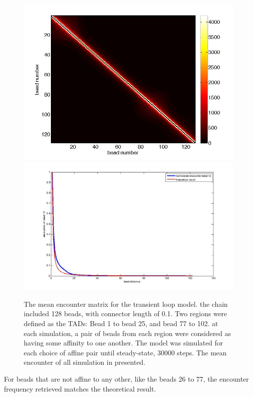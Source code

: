 \documentclass[12pt]{book}
\begin{document}
\begin{figure}[H]
\includegraphics[scale=0.2]{encounterFrequency128beadsWithTadTransientModel}
\includegraphics[scale=0.2]{encounterCrossectionBead12TransientLoopModelwithTheoreticalCurve}
\caption{\scriptsize{The mean encounter matrix for the transient loop model. the chain included 128 beads, with connector length of 0.1. Two regions were defined as the TADs: Bead 1 to bead 25, and bead 77 to 102. at each simulation, a pair of beads from each region were considered as having some affinity to one another. The model was simulated for each choice of affine pair until steady-state, 30000 steps. The mean encounter of all simulation in presented.}} 
\end{figure}

For beads that are not affine to any other, like the beads 26 to 77, the encounter frequency retrieved matches the theoretical result. 
\end{document}
